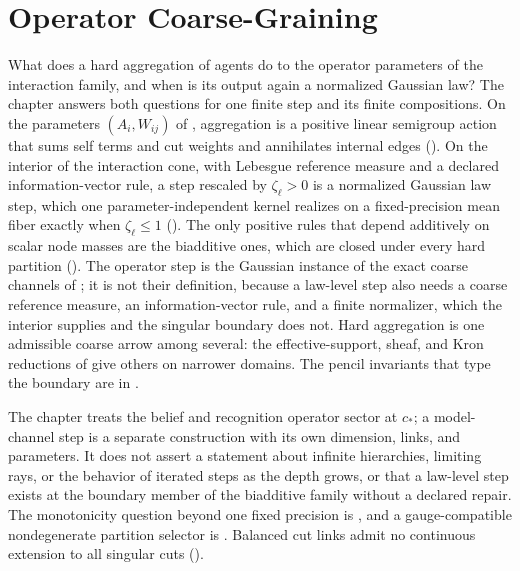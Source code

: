 \chapter{Operator Coarse-Graining}
\label{ch:gaussian-renormalization}

What does a hard aggregation of agents do to the operator parameters of the
interaction family, and when is its output again a normalized Gaussian law? The
chapter answers both questions for one finite step and its finite compositions. On
the parameters \((A_i,W_{ij})\) of ,
aggregation is a positive linear semigroup action that sums self terms and cut
weights and annihilates internal edges (). On
the interior of the interaction cone, with Lebesgue reference measure and a declared
information-vector rule, a step rescaled by \(\zeta_\ell>0\) is a normalized
Gaussian law step, which one parameter-independent kernel realizes on a
fixed-precision mean fiber exactly when \(\zeta_\ell\leq1\)
(). The only positive rules that depend
additively on scalar node masses are the biadditive ones, which are closed under
every hard partition (). The operator step
is the Gaussian instance of the exact coarse channels of
; it is not their definition, because a
law-level step also needs a coarse reference measure, an information-vector rule,
and a finite normalizer, which the interior supplies and the singular boundary does
not. Hard aggregation is one admissible coarse arrow among several: the
effective-support, sheaf, and Kron reductions of 
give others on narrower domains. The pencil invariants that type the boundary are
in .

The chapter treats the belief and recognition operator sector at \(c_*\); a
model-channel step is a separate construction with its own dimension, links, and
parameters. It does not assert a statement about infinite hierarchies, limiting
rays, or the behavior of iterated steps as the depth grows, or that a law-level step
exists at the boundary member of the biadditive family without a declared repair.
 The monotonicity question beyond one fixed precision is
, and a gauge-compatible nondegenerate partition
selector is . Balanced cut links admit no continuous extension
to all singular cuts ().

